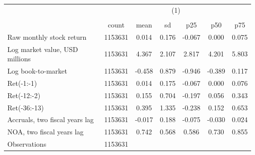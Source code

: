 {
\def\sym#1{\ifmmode^{#1}\else\(^{#1}\)\fi}
\begin{tabular}{l*{1}{cccccc}}
\hline\hline
                    &\multicolumn{6}{c}{(1)}                                                      \\
                    &\multicolumn{6}{c}{}                                                         \\
                    &       count&        mean&          sd&         p25&         p50&         p75\\
\hline
Raw monthly stock return&     1153631&       0.014&       0.176&      -0.067&       0.000&       0.075\\
Log market value, USD millions&     1153631&       4.367&       2.107&       2.817&       4.201&       5.803\\
Log book-to-market  &     1153631&      -0.458&       0.879&      -0.946&      -0.389&       0.117\\
Ret(-1:-1)          &     1153631&       0.014&       0.175&      -0.067&       0.000&       0.076\\
Ret(-12:-2)         &     1153631&       0.155&       0.704&      -0.197&       0.056&       0.343\\
Ret(-36:-13)        &     1153631&       0.395&       1.335&      -0.238&       0.152&       0.653\\
Accruals, two fiscal years lag&     1153631&      -0.017&       0.188&      -0.075&      -0.030&       0.024\\
NOA, two fiscal years lag&     1153631&       0.742&       0.568&       0.586&       0.730&       0.855\\
\hline
Observations        &     1153631&            &            &            &            &            \\
\hline\hline
\end{tabular}
}

